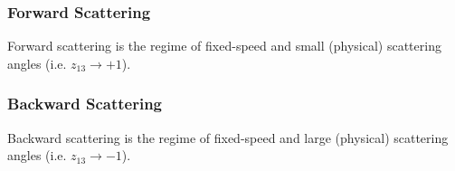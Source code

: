 \subsubsection{Forward Scattering}
Forward scattering is the regime of fixed-speed and small (physical) scattering angles (i.e. $z_{13} \rightarrow +1$).
\subsubsection{Backward Scattering}
Backward scattering is the regime of fixed-speed and large (physical) scattering angles (i.e. $z_{13} \rightarrow -1$).
